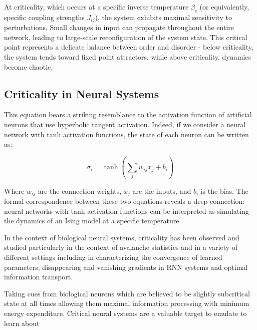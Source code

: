 At criticality, which occurs at a specific inverse temperature $\beta_c$ (or equivalently, specific coupling strengths $J_{ij}$), the system exhibits maximal sensitivity to perturbations. Small changes in input can propagate throughout the entire network, leading to large-scale reconfiguration of the system state. This critical point represents a delicate balance between order and disorder - below criticality, the system tends toward fixed point attractors, while above criticality, dynamics become chaotic.

\subsection{Criticality in Neural Systems}

This equation bears a striking resemblance to the activation function of artificial neurons that use hyperbolic tangent activation. Indeed, if we consider a neural network with tanh activation functions, the state of each neuron can be written as:

$$\sigma_i = \tanh(\sum_j w_{ij}x_j + b_i)$$

Where $w_{ij}$ are the connection weights, $x_j$ are the inputs, and $b_i$ is the bias. The formal correspondence between these two equations reveals a deep connection: neural networks with tanh activation functions can be interpreted as simulating the dynamics of an Ising model at a specific temperature.

In the context of biological neural systems, criticality has been observed and studied particularly in the context of avalanche statistics and in a variety of different settings including in characterizing the convergence of learned parameters, disappearing and vanishing gradients in RNN systems and optimal information transport.

Taking cues from biological neurons which are believed to be slightly subcritical state at all times allowing them maximal information processing with minimum energy expenditure. Critical neural systems are a valuable target to emulate to learn about